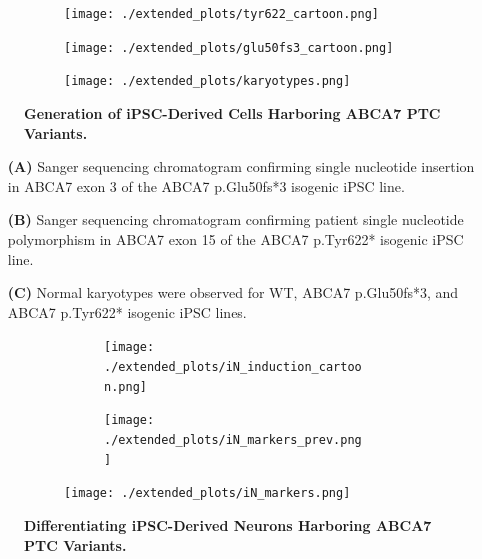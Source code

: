 \documentclass[12pt]{article}
\begin{document}
 \clearpage
\begin{figure}[H]
    \begin{subfigure}[t]{0.4\textwidth}
        \caption{}
        \hspace{1.5cm}
        \texttt{[image: ./extended\_plots/tyr622\_cartoon.png]}        
    \end{subfigure}  
    \hspace{1.5cm}
    \begin{subfigure}[t]{0.4\textwidth}
        \caption{}
        \texttt{[image: ./extended\_plots/glu50fs3\_cartoon.png]}        
    \end{subfigure}  
    \par
    \begin{subfigure}[t]{0.9\textwidth}
        \caption{}
        \hspace{1.5cm}
        \texttt{[image: ./extended\_plots/karyotypes.png]}        
    \end{subfigure}  
    \caption{
        \textbf{Generation of iPSC-Derived Cells Harboring ABCA7 PTC Variants.}\\
    }
    \label{fig:ipsc_lines}
\end{figure}
\begin{itemize}
    \item[\textbf{(A)}] Sanger sequencing chromatogram confirming single nucleotide insertion in ABCA7 exon 3 of the ABCA7 p.Glu50fs*3 isogenic iPSC line.
    \item[\textbf{(B)}] Sanger sequencing chromatogram confirming patient single nucleotide polymorphism in ABCA7 exon 15 of the ABCA7 p.Tyr622* isogenic iPSC line. 
    \item[\textbf{(C)}] Normal karyotypes were observed for WT, ABCA7 p.Glu50fs*3, and ABCA7 p.Tyr622* isogenic iPSC lines. 
\end{itemize} \clearpage
\begin{figure}[H]
    \begin{subfigure}[t]{\textwidth}
        \begin{subfigure}[t]{0.45\textwidth}
            \caption{}
            \texttt{[image: ./extended\_plots/iN\_induction\_cartoon.png]}        
        \end{subfigure}
        \begin{subfigure}[t]{0.45\textwidth}
            \caption{}
            \texttt{[image: ./extended\_plots/iN\_markers\_prev.png]}        
        \end{subfigure}
    \end{subfigure}
    \begin{subfigure}[t]{0.8\textwidth}
        \caption{}
        \hspace{2cm}
        \texttt{[image: ./extended\_plots/iN\_markers.png]}        
    \end{subfigure}
    \caption{
        \textbf{Differentiating iPSC-Derived Neurons Harboring ABCA7 PTC Variants.}\\
    }
    \label{fig:iN_markers}
\end{figure}
\end{document}
